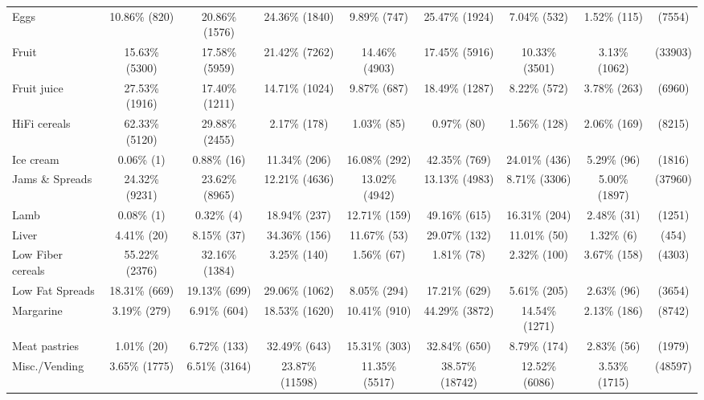 \documentclass[utf8]{frontiers_suppmat} %
\begin{document}
\begin{table}[]
{\begin{tabular}{@{}lcccccccc@{}}
Eggs                      & 10.86\%    (820) & 20.86\%   (1576) & 24.36\%   (1840) & 9.89\%   (747)  & 25.47\%   (1924) & 7.04\%   (532)  & 1.52\%   (115)  &    (7554) \\
Fruit                     & 15.63\%   (5300) & 17.58\%   (5959) & 21.42\%   (7262) & 14.46\%  (4903) & 17.45\%   (5916) & 10.33\%  (3501) & 3.13\%  (1062)  &   (33903) \\
Fruit juice               & 27.53\%   (1916) & 17.40\%   (1211) & 14.71\%   (1024) & 9.87\%   (687)  & 18.49\%   (1287) & 8.22\%   (572)  & 3.78\%   (263)  &    (6960) \\
HiFi cereals              & 62.33\%   (5120) & 29.88\%   (2455) & 2.17\%    (178)  & 1.03\%    (85)  & 0.97\%     (80)  & 1.56\%   (128)  & 2.06\%   (169)  &    (8215) \\
Ice cream                 & 0.06\%      (1)  & 0.88\%     (16)  & 11.34\%    (206) & 16.08\%   (292) & 42.35\%    (769) & 24.01\%   (436) & 5.29\%    (96)  &    (1816) \\
Jams \& Spreads           & 24.32\%   (9231) & 23.62\%   (8965) & 12.21\%   (4636) & 13.02\%  (4942) & 13.13\%   (4983) & 8.71\%  (3306)  & 5.00\%  (1897)  &   (37960) \\
Lamb                      & 0.08\%      (1)  & 0.32\%      (4)  & 18.94\%    (237) & 12.71\%   (159) & 49.16\%    (615) & 16.31\%   (204) & 2.48\%    (31)  &    (1251) \\
Liver                     & 4.41\%     (20)  & 8.15\%     (37)  & 34.36\%    (156) & 11.67\%    (53) & 29.07\%    (132) & 11.01\%    (50) & 1.32\%     (6)  &     (454) \\
Low Fiber cereals         & 55.22\%   (2376) & 32.16\%   (1384) & 3.25\%    (140)  & 1.56\%    (67)  & 1.81\%     (78)  & 2.32\%   (100)  & 3.67\%   (158)  &    (4303) \\
Low Fat Spreads           & 18.31\%    (669) & 19.13\%    (699) & 29.06\%   (1062) & 8.05\%   (294)  & 17.21\%    (629) & 5.61\%   (205)  & 2.63\%    (96)  &    (3654) \\
Margarine                 & 3.19\%    (279)  & 6.91\%    (604)  & 18.53\%   (1620) & 10.41\%   (910) & 44.29\%   (3872) & 14.54\%  (1271) & 2.13\%   (186)  &    (8742) \\
Meat pastries             & 1.01\%     (20)  & 6.72\%    (133)  & 32.49\%    (643) & 15.31\%   (303) & 32.84\%    (650) & 8.79\%   (174)  & 2.83\%    (56)  &    (1979) \\
Misc./Vending             & 3.65\%   (1775)  & 6.51\%   (3164)  & 23.87\%  (11598) & 11.35\%  (5517) & 38.57\%  (18742) & 12.52\%  (6086) & 3.53\%  (1715)  &   (48597) \\

\end{tabular}}
\end{table}
\end{document}
